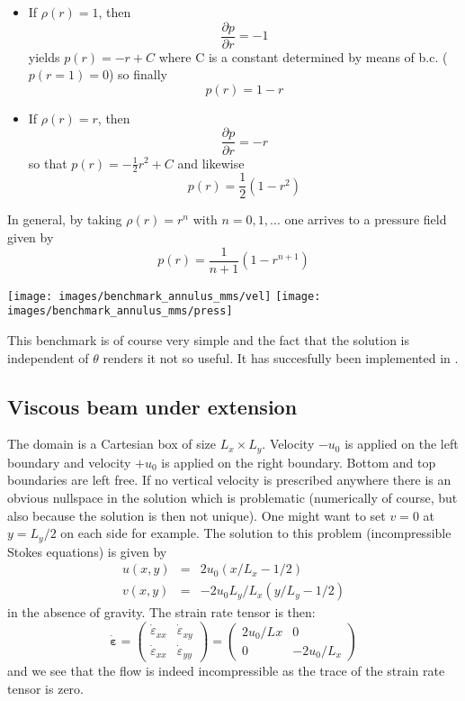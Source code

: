 \begin{itemize}
\item If $\rho(r)=1$, then 
\[
\frac{\partial p}{\partial r}  = - 1
\]
yields $p(r)=-r+C$ where C is a constant determined by means of b.c. ($p(r=1)=0$) so finally
\[
\boxed{
p(r)=1-r
}
\]

\item If $\rho(r)=r$, then 
\[
\frac{\partial p}{\partial r}  = - r
\]
so that $p(r)=-\frac{1}{2}r^2 + C$ and likewise
\[
\boxed{
p(r)=\frac{1}{2} (1- r^2)
}
\]
\end{itemize}
  
In general, by taking $\rho(r)=r^n$ with $n=0,1,...$ one arrives to a pressure field given by 
\[
\boxed{
p(r)=\frac{1}{n+1} (1- r^{n+1})
}
\]

\begin{center}
\texttt{[image: images/benchmark\_annulus\_mms/vel]}
\texttt{[image: images/benchmark\_annulus\_mms/press]}
\end{center}

This benchmark is of course very simple and the fact that the solution is independent of $\theta$
renders it not so useful. It has succesfully been implemented in \elefant.

\subsection{Viscous beam under extension}

The domain is a Cartesian box of size $L_x \times L_y$. 
Velocity $-u_0$ is applied on the left boundary and 
velocity $+u_0$ is applied on the right boundary. 
Bottom and top boundaries are left free. 
If no vertical velocity is prescribed anywhere there is an obvious nullspace 
in the solution which is problematic (numerically of course, but also 
because the solution is then not unique). One might want to set $v=0$ at $y=L_y/2$
on each side for example. 
The solution to this problem (incompressible Stokes equations) is given by
\begin{eqnarray}
u(x,y)&=&2u_0(x/L_x-1/2)\\
v(x,y)&=&-2 u_0 L_y/L_x (y/L_y-1/2)
\end{eqnarray}
in the absence of gravity. The strain rate tensor is then:
\[
\dot{\bm \varepsilon} =
\left(
\begin{array}{cc}
\dot{\varepsilon}_{xx} & \dot{\varepsilon}_{xy} \\
\dot{\varepsilon}_{xx} & \dot{\varepsilon}_{yy} 
\end{array}
\right)
=
\left(
\begin{array}{cc}
2 u_0 /Lx & 0 \\
0 & -2 u_0 /L_x 
\end{array}
\right)
\]
and we see that the flow is indeed incompressible as the trace 
of the strain rate tensor is zero. 

